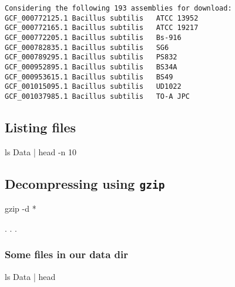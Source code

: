 \documentclass[
  letterpaper,
]{scrbook}
\newenvironment{Shaded}{\begin{snugshade}}{\end{snugshade}}
\newcommand{\AttributeTok}[1]{\textcolor[rgb]{0.40,0.46,0.14}{#1}}
\newcommand{\FunctionTok}[1]{\textcolor[rgb]{0.28,0.35,0.67}{#1}}
\newcommand{\KeywordTok}[1]{\textcolor[rgb]{0.00,0.46,0.62}{#1}}
\newcommand{\NormalTok}[1]{\textcolor[rgb]{0.00,0.46,0.62}{#1}}
\newcommand{\PreprocessorTok}[1]{\textcolor[rgb]{0.68,0.00,0.00}{#1}}
\begin{document}
\begin{verbatim}
Considering the following 193 assemblies for download:
GCF_000772125.1 Bacillus subtilis   ATCC 13952
GCF_000772165.1 Bacillus subtilis   ATCC 19217
GCF_000772205.1 Bacillus subtilis   Bs-916
GCF_000782835.1 Bacillus subtilis   SG6
GCF_000789295.1 Bacillus subtilis   PS832
GCF_000952895.1 Bacillus subtilis   BS34A
GCF_000953615.1 Bacillus subtilis   BS49
GCF_001015095.1 Bacillus subtilis   UD1022
GCF_001037985.1 Bacillus subtilis   TO-A JPC
\end{verbatim}

\hypertarget{listing-files}{%
\subsection*{Listing files}\label{listing-files}}

\begin{Shaded}
\begin{Highlighting}[]
\FunctionTok{ls}\NormalTok{ Data }\KeywordTok{|} \FunctionTok{head} \AttributeTok{{-}n}\NormalTok{ 10}
\end{Highlighting}
\end{Shaded}

\hypertarget{decompressing-using-gzip}{%
\subsection*{\texorpdfstring{Decompressing using
\texttt{gzip}}{Decompressing using gzip}}\label{decompressing-using-gzip}}

\begin{Shaded}
\begin{Highlighting}[]
\FunctionTok{gzip} \AttributeTok{{-}d} \PreprocessorTok{*}
\end{Highlighting}
\end{Shaded}

. . .

\hypertarget{some-files-in-our-data-dir}{%
\subsubsection*{Some files in our data
dir}\label{some-files-in-our-data-dir}}

\begin{Shaded}
\begin{Highlighting}[]
\FunctionTok{ls}\NormalTok{ Data }\KeywordTok{|} \FunctionTok{head}
\end{Highlighting}
\end{Shaded}
\end{document}
